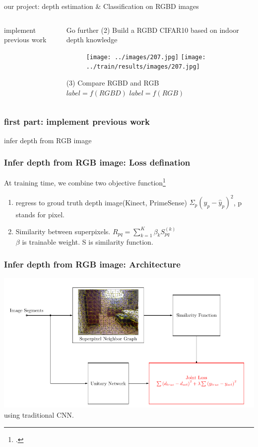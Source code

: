 \documentclass{beamer}
\begin{document}
\begin{frame}
\begin{alertblock}{our project: depth estimation \& Classification on RGBD images}
\begin{columns}
\begin{column}{.37\textwidth}
\begin{block}{implement previous work}
\end{block}
\end{column}
\begin{column}{.44\textwidth}
\begin{exampleblock}{Go further}
(2) Build a RGBD CIFAR10 based on indoor depth knowledge\\
\begin{figure}
\texttt{[image: ../images/207.jpg]}
\texttt{[image: ../train/results/images/207.jpg]}
\end{figure}
(3) Compare RGBD and RGB\\
$label=f(RGBD)$
$label=f(RGB)$
\end{exampleblock}
\end{column}
\end{columns}
\end{alertblock}
\end{frame}


\begin{frame}
\frametitle{first part: implement previous work}
\Huge{\centerline{infer depth from RGB image}}
\end{frame}

\begin{frame}
\frametitle{Infer depth from RGB image: Loss defination}
At training time, we combine two objective function\footcite{liu2015deep}
\begin{enumerate}
\item regress to groud truth depth image(Kinect, PrimeSense)
$ \Sigma_{p}(y_p-\hat{y}_p)^2$, p stands for pixel.
\item Similarity between superpixels.
$R_{pq} = \sum_{k=1}^K \beta_k S_{pq}^{(k)}$\\
 $\beta$ is trainable weight. S is similarity function.
\end{enumerate}
\end{frame}


\begin{frame}
\frametitle{Infer depth from RGB image: Architecture}
\includegraphics[width=\linewidth]{arch.png}
using traditional CNN.
\end{frame}
\end{document}
